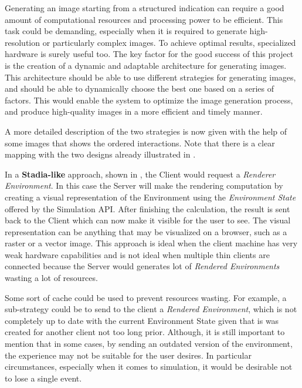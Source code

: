 Generating an image starting from a structured indication can require a good amount of computational resources and processing power to be efficient. This task could be demanding, especially when it is required to generate high-resolution or particularly complex images. To achieve optimal results, specialized hardware is surely useful too. The key factor for the good success of this project is the creation of a dynamic and adaptable architecture for generating images. This architecture should be able to use different strategies for generating images, and should be able to dynamically choose the best one based on a series of factors. This would enable the system to optimize the image generation process, and produce high-quality images in a more efficient and timely manner.\newline

\noindent A more detailed description of the two strategies is now given with the help of some images that shows the ordered interactions.  Note that there is a clear mapping with the two designs already illustrated in .\newline

In a \textbf{Stadia-like} approach, shown in , the Client would request a \textit{Renderer Environment}. In this case the Server will make the rendering computation by creating a visual representation of the Environment using the \textit{Environment State} offered by the Simulation API.
After finishing the calculation, the result is sent back to the Client which can now make it visible for the user to see. The visual representation can be anything that may be visualized on a browser, such as a raster or a vector image. This approach is ideal when the client machine has very weak hardware capabilities and is not ideal when multiple thin clients are connected because the Server would generates lot of \textit{Rendered Environments} wasting a lot of resources.


\begin{warn}[Note:]
	Some sort of cache could be used to prevent resources wasting.
	For example, a sub-strategy could be to send to the client a \textit{Rendered Environment}, which is not completely up to date with the current Environment State given that is was created for another client not too long prior. Although, it is still important to mention that in some cases, by sending an outdated version of the environment, the experience may not be suitable for the user desires. In particular circumstances, especially when it comes to simulation, it would be desirable not to lose a single event.
\end{warn}

